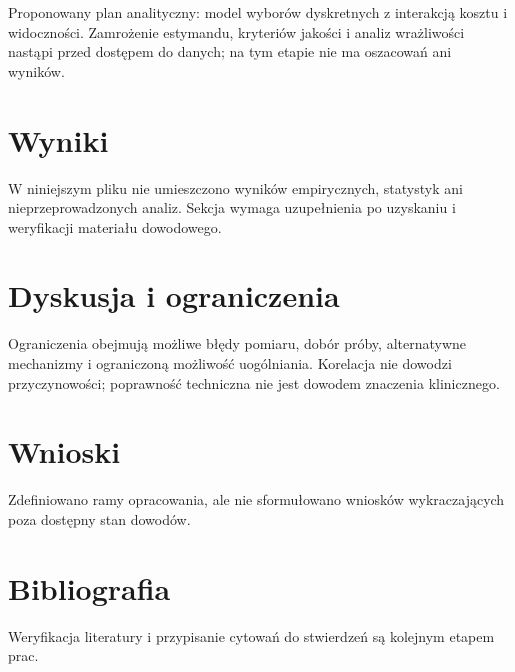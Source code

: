 \documentclass[11pt,a4paper]{article}
\begin{document}
Proponowany plan analityczny: model wyborów dyskretnych z interakcją kosztu i widoczności. Zamrożenie estymandu, kryteriów jakości i analiz wrażliwości nastąpi przed dostępem do danych; na tym etapie nie ma oszacowań ani wyników.

\section{Wyniki}

W niniejszym pliku nie umieszczono wyników empirycznych, statystyk ani nieprzeprowadzonych analiz. Sekcja wymaga uzupełnienia po uzyskaniu i weryfikacji materiału dowodowego.

\section{Dyskusja i ograniczenia}

Ograniczenia obejmują możliwe błędy pomiaru, dobór próby, alternatywne mechanizmy i ograniczoną możliwość uogólniania. Korelacja nie dowodzi przyczynowości; poprawność techniczna nie jest dowodem znaczenia klinicznego.

\section{Wnioski}

Zdefiniowano ramy opracowania, ale nie sformułowano wniosków wykraczających poza dostępny stan dowodów.

\section*{Bibliografia}

Weryfikacja literatury i przypisanie cytowań do stwierdzeń są kolejnym etapem prac.
\end{document}
